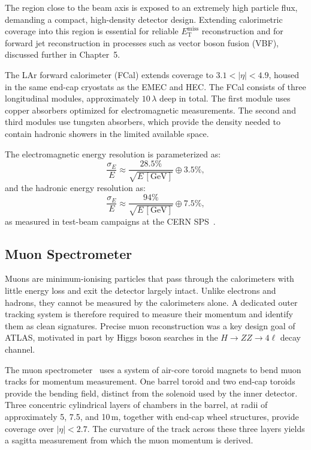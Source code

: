 The region close to the beam axis is exposed to an extremely high particle flux, demanding a compact, high-density detector design.
Extending calorimetric coverage into this region is essential for reliable $E_{\text{T}}^{\text{miss}}$ reconstruction and for forward jet reconstruction in processes such as vector boson fusion (VBF), discussed further in Chapter~5.

The LAr forward calorimeter (FCal) extends coverage to $3.1 < |\eta| < 4.9$, housed in the same end-cap cryostats as the EMEC and HEC. 
The FCal consists of three longitudinal modules, approximately $10\,\lambda$ deep in total. 
The first module uses copper absorbers optimized for electromagnetic measurements. 
The second and third modules use tungsten absorbers, which provide the density needed to contain hadronic showers in the limited available space.

The electromagnetic energy resolution is parameterized as:
%
\begin{equation}
	\frac{\sigma_E}{E} \approx \frac{28.5\%}{\sqrt{E\,[\text{GeV}]}} \oplus 3.5\%,
	\label{eq:fcal_em_resolution}
\end{equation}
%
and the hadronic energy resolution as:
%
\begin{equation}
	\frac{\sigma_E}{E} \approx \frac{94\%}{\sqrt{E\,[\text{GeV}]}} \oplus 7.5\%,
	\label{eq:fcal_had_resolution}
\end{equation}
%
as measured in test-beam campaigns at the CERN SPS~\cite{atlas}.

\subsection{Muon Spectrometer}

Muons are minimum-ionising particles that pass through the calorimeters with little energy loss and exit the detector largely intact. 
Unlike electrons and hadrons, they cannot be measured by the calorimeters alone. 
A dedicated outer tracking system is therefore required to measure their momentum and identify them as clean signatures. 
Precise muon reconstruction was a key design goal of ATLAS, motivated in part by Higgs boson searches in the $H \to ZZ \to 4\ell$ decay channel.

The muon spectrometer~\cite{atlas} uses a system of air-core toroid magnets to bend muon tracks for momentum measurement. 
One barrel toroid and two end-cap toroids provide the bending field, distinct from the solenoid used by the inner detector. 
Three concentric cylindrical layers of chambers in the barrel, at radii of approximately 5, 7.5, and 10\,m, together with end-cap wheel structures, provide coverage over $|\eta| < 2.7$. 
The curvature of the track across these three layers yields a sagitta measurement from which the muon momentum is derived.

